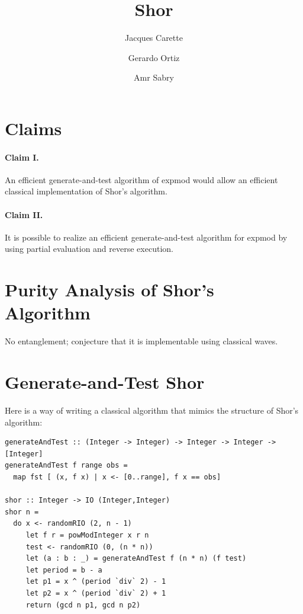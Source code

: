 \documentclass{article}
\title{Shor}
\author{Jacques Carette \and Gerardo Ortiz \and Amr Sabry}
\begin{document}
\maketitle

\newcommand{\st}[5]{\ensuremath{| #1, #2, #3, #4, #5 \rangle}}
\newcommand{\ket}[1]{\ensuremath{| #1 \rangle}}

\section{Claims}

\paragraph*{Claim I.}
An efficient generate-and-test algorithm of expmod would allow an
efficient classical implementation of Shor's algorithm.

\paragraph*{Claim II.}
It is possible to realize an efficient generate-and-test algorithm for
expmod by using partial evaluation and reverse execution.

\section{Purity Analysis of Shor's Algorithm}

No entanglement; conjecture that it is implementable using classical waves. 

\section{Generate-and-Test Shor}

Here is a way of writing a classical algorithm that mimics the
structure of Shor's algorithm:

\begin{verbatim}
generateAndTest :: (Integer -> Integer) -> Integer -> Integer -> [Integer]
generateAndTest f range obs =
  map fst [ (x, f x) | x <- [0..range], f x == obs]

shor :: Integer -> IO (Integer,Integer)
shor n = 
  do x <- randomRIO (2, n - 1)
     let f r = powModInteger x r n                       
     test <- randomRIO (0, (n * n))
     let (a : b : _) = generateAndTest f (n * n) (f test)
     let period = b - a                                  
     let p1 = x ^ (period `div` 2) - 1                   
     let p2 = x ^ (period `div` 2) + 1                   
     return (gcd n p1, gcd n p2)                         
\end{verbatim}
\end{document}
